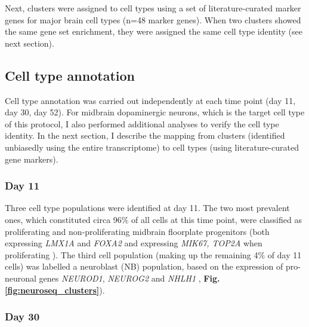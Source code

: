 Next, clusters were assigned to cell types using a set of literature-curated marker genes for major brain cell types (n=48 marker genes). 
When two clusters showed the same gene set enrichment, they were assigned the same cell type identity (see next section).

\subsection{Cell type annotation}
Cell type annotation was carried out independently at each time point (day 11, day 30, day 52).
For midbrain dopaminergic neurons, which is the target cell type of this protocol, I also performed additional analyses to verify the cell type identity.
In the next section, I describe the mapping from clusters (identified unbiasedly using the entire transcriptome) to cell types (using literature-curated gene markers).

\subsubsection{Day 11}

Three cell type populations were identified at day 11.
The two most prevalent ones, which constituted circa 96\% of all cells at this time point, were classified as proliferating and non-proliferating midbrain floorplate progenitors (both expressing \textit{LMX1A} and \textit{FOXA2} and expressing \textit{MIK67, TOP2A} when proliferating \cite{la2016molecular}).
The third cell population (making up the remaining 4\% of day 11 cells) was labelled a neuroblast (NB) population, based on the expression of pro-neuronal genes \textit{NEUROD1}, \textit{NEUROG2} and \textit{NHLH1} \cite{bertrand2002proneural, lacomme2012neurog2}, \textbf{Fig. \ref{fig:neuroseq_clusters}}).

\subsubsection{Day 30}

